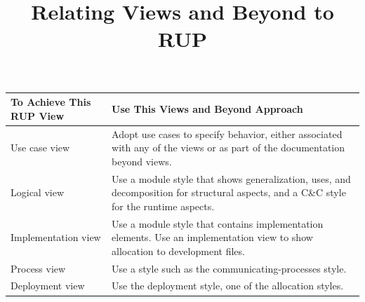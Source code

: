 \documentclass[11pt]{article}
\begin{document}
\title{Relating Views and Beyond to RUP}
\author{}
\date{}
\maketitle

\begin{tabularx}{\textwidth}{@{}%
  >{\raggedright\arraybackslash}p{}%
  >{\raggedright\arraybackslash}X@{}}
\toprule
\textbf{To Achieve This RUP View} & \textbf{Use This Views and Beyond Approach} \\
\midrule

Use case view &
Adopt use cases to specify behavior, either associated with any of the views or as part of the documentation beyond views. \\
\addlinespace[0.6em]

Logical view &
Use a module style that shows generalization, uses, and decomposition for structural aspects, and a C\&C style for the runtime aspects. \\
\addlinespace[0.6em]

Implementation view &
Use a module style that contains implementation elements. Use an implementation view to show allocation to development files. \\
\addlinespace[0.6em]

Process view &
Use a style such as the communicating-processes style. \\
\addlinespace[0.6em]

Deployment view &
Use the deployment style, one of the allocation styles. \\
\bottomrule
\end{tabularx}
\end{document}
